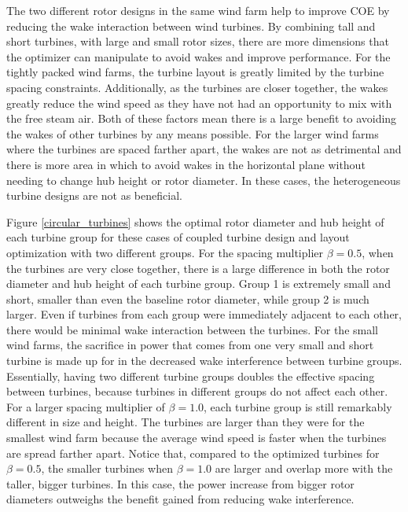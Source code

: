 \documentclass[WESD, manuscript]{copernicus}
\begin{document}
The two different rotor designs in the same wind farm help to improve COE by reducing the wake interaction between wind turbines. By combining tall and short turbines, with large and small rotor sizes, there are more dimensions that the optimizer can manipulate to avoid wakes and improve performance. For the tightly packed wind farms, the turbine layout is greatly limited by the turbine spacing constraints. Additionally, as the turbines are closer together, the wakes greatly reduce the wind speed as they have not had an opportunity to mix with the free steam air. Both of these factors mean there is a large benefit to avoiding the wakes of other turbines by any means possible. For the larger wind farms where the turbines are spaced farther apart, the wakes are not as detrimental and there is more area in which to avoid wakes in the horizontal plane without needing to change hub height or rotor diameter. In these cases, the heterogeneous turbine designs are not as beneficial.

Figure \ref{circular_turbines} shows the optimal rotor diameter and hub height of each turbine group for these cases of coupled turbine design and layout optimization with two different groups. For the spacing multiplier $\beta=0.5$, when the turbines are very close together, there is a large difference in both the rotor diameter and hub height of each turbine group. Group 1 is extremely small and short, smaller than even the baseline rotor diameter, while group 2 is much larger. Even if turbines from each group were immediately adjacent to each other, there would be minimal wake interaction between the turbines. For the small wind farms, the sacrifice in power that comes from one very small and short turbine is made up for in the decreased wake interference between turbine groups. Essentially, having two different turbine groups doubles the effective spacing between turbines, because turbines in different groups do not affect each other. For a larger spacing multiplier of $\beta=1.0$, each turbine group is still remarkably different in size and height. The turbines are larger than they were for the smallest wind farm because the average wind speed is faster when the turbines are spread farther apart. Notice that, compared to the optimized turbines for $\beta=0.5$, the smaller turbines when $\beta=1.0$ are larger and overlap more with the taller, bigger turbines. In this case, the power increase from bigger rotor diameters outweighs the benefit gained from reducing wake interference. 
\end{document}
